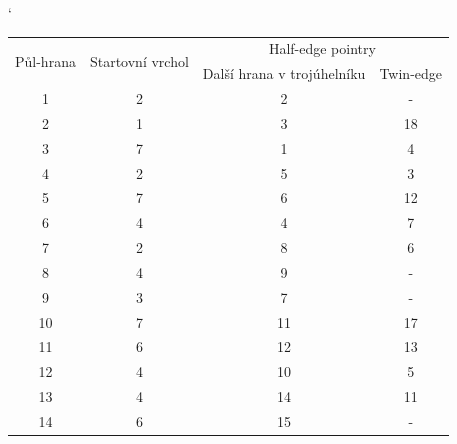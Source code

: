 \documentclass[12pt,a4paper]{article}
\begin{document}
\begin{table}[h!]
\catcode`
\begin{tabular}{|c||c||c|c|}
\hline
\multirow{2}{*}{Půl-hrana} & \multirow{2}{*}{Startovní vrchol} & \multicolumn{2}{c|}{Half-edge pointry} \\ \cline{3-4} 
                           &                                   & Další hrana v trojúhelníku & Twin-edge \\ \hline
1                          & 2                                 & 2                          & -         \\ \hline
2                          & 1                                 & 3                          & 18        \\ \hline
3                          & 7                                 & 1                          & 4         \\ \hline
4                          & 2                                 & 5                          & 3         \\ \hline
5                          & 7                                 & 6                          & 12        \\ \hline
6                          & 4                                 & 4                          & 7         \\ \hline
7                          & 2                                 & 8                          & 6         \\ \hline
8                          & 4                                 & 9                          & -         \\ \hline
9                          & 3                                 & 7                          & -         \\ \hline
10                         & 7                                 & 11                         & 17        \\ \hline
11                         & 6                                 & 12                         & 13        \\ \hline
12                         & 4                                 & 10                         & 5         \\ \hline
13                         & 4                                 & 14                         & 11        \\ \hline
14                         & 6                                 & 15                         & -         \\ \hline

\end{tabular}
\end{table}
\end{document}
